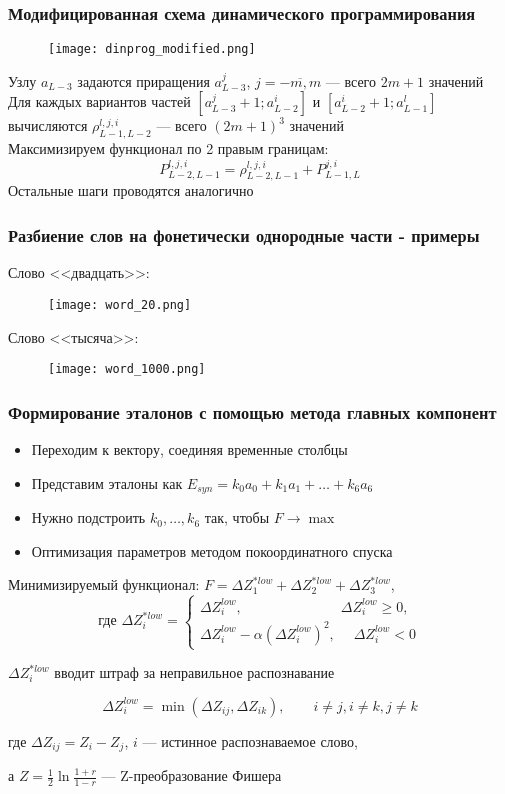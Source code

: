 \begin{frame}
\frametitle{\small Модифицированная схема динамического программирования}
\footnotesize
\vfill
\begin{figure}[h]
	\texttt{[image: dinprog\_modified.png]}
\end{figure}
\vfill
Узлу $a_{L-3}$ задаются приращения $a_{L-3}^j$, $j = \overline{-m, m}$ --- всего $2m+1$ значений \\
Для каждых вариантов частей $[a_{L-3}^j + 1; a_{L-2}^i]$ и $[a_{L-2}^i + 1; a_{L-1}^l]$ вычисляются $\rho_{L-1,L-2}^{l, j, i}$ --- всего $(2m + 1)^3$ значений \\
Максимизируем функционал по 2 правым границам:
$$
P_{L-2, L-1}^{l, j, i} = \rho_{L-2, L-1}^{l, j, i} + P_{L-1, L}^{j, i}
$$
\bigbreak
Остальные шаги проводятся аналогично
\vfill
\end{frame}

\begin{frame}
\frametitle{\small Разбиение слов на фонетически однородные части - примеры}
\footnotesize
\vfill
Слово <<двадцать>>:
\begin{figure}[h]
	\texttt{[image: word\_20.png]}
\end{figure}
\vfill
Слово <<тысяча>>:
\begin{figure}[h]
	\texttt{[image: word\_1000.png]}
\end{figure}
\vfill
\end{frame}

\begin{frame}
\frametitle{\small Формирование эталонов с помощью метода главных компонент}
\small
\vfill
\begin{itemize}
	\item Переходим к вектору, соединяя временные столбцы
	\item Представим эталоны как $E_{syn} = k_0 a_0 + k_1 a_1 + \dots + k_6 a_6$
	\item Нужно подстроить $k_0, \dots, k_6$ так, чтобы $F \rightarrow \max$
	\item Оптимизация параметров методом покоординатного спуска
\end{itemize}
\vfill
Минимизируемый функционал: $F = \Delta Z^{*low}_{1} + \Delta Z^{*low}_{2} + \Delta Z^{*low}_{3}$,
$$
\text{где }
\Delta Z^{*low}_{i} = \left\{
\begin{array}{ll}
\Delta Z^{low}_{i}, \qquad\qquad\qquad\quad \Delta Z^{low}_{i} \ge 0,\\
\Delta Z^{low}_{i} - \alpha (\Delta Z^{low}_{i})^2, \;\quad \Delta Z^{low}_{i} < 0
\end{array}
\right.
$$

$\Delta Z^{*low}_{i}$ вводит штраф за неправильное распознавание

$$
\Delta Z^{low}_{i} = \min(\Delta Z_{ij}, \Delta Z_{ik}), \qquad i \ne j, i \ne k, j \ne k
$$

где $\Delta Z_{ij} = Z_i - Z_j$, $i$ --- истинное распознаваемое слово,

а $Z = \frac{1}{2} \ln \frac{1 + r}{1 - r}$ --- Z-преобразование Фишера
\vfill
\end{frame}

